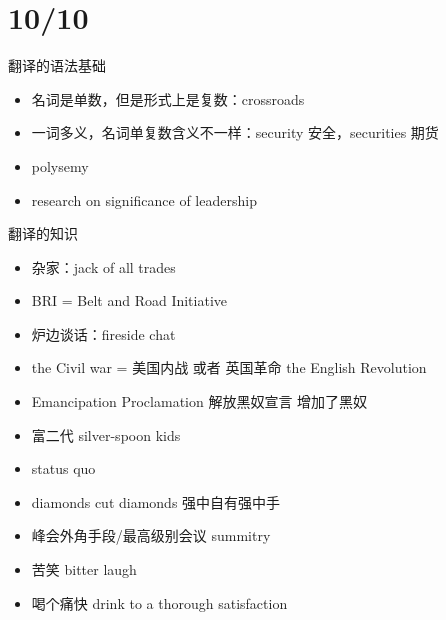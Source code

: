 \documentclass{ctexart}
\begin{document}
\section{10/10}
翻译的语法基础
\begin{itemize}
  \item 名词是单数，但是形式上是复数：crossroads 
  \item 一词多义，名词单复数含义不一样：security 安全，securities 期货
  \item polysemy
  \item research on significance of leadership
\end{itemize}
翻译的知识
\begin{itemize}
  \item 杂家：jack of all trades
  \item BRI = Belt and Road Initiative
  \item 炉边谈话：fireside chat
  \item the Civil war = 美国内战 或者 英国革命 the English Revolution
  \item Emancipation Proclamation 解放黑奴宣言 增加了黑奴
  \item 富二代 silver-spoon kids 
  \item status quo
  \item diamonds cut diamonds 强中自有强中手
  \item 峰会外角手段/最高级别会议 summitry
  \item 苦笑 bitter laugh
  \item 喝个痛快 drink to a thorough satisfaction
\end{itemize}
\end{document}
